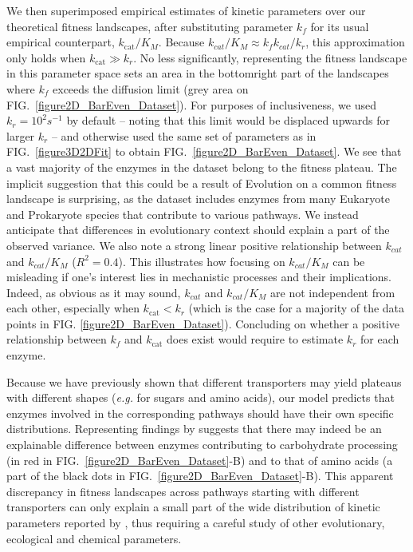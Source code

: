 \documentclass[11pt,onecolumn]{article}
\begin{document}
We then superimposed empirical estimates of kinetic parameters over our theoretical fitness landscapes, after substituting parameter $k_f$ for its usual empirical counterpart, $k_\text{cat} / K_M$. Because $k_{cat}/K_M \approx k_fk_{cat}/k_r$, this approximation only holds when $k_\text{cat} \gg k_r$. No less significantly, representing the fitness landscape in this parameter space
sets an area in the bottomright part of the landscapes where $k_f$ exceeds the diffusion limit (grey area on FIG.~\ref{figure2D_BarEven_Dataset}). For purposes of inclusiveness, we used $k_r=10^{2}s^{-1}$ by default -- noting that this limit would be displaced upwards for larger $k_r$ -- and otherwise used the same set of parameters as in FIG.~\ref{figure3D2DFit} to obtain FIG.~\ref{figure2D_BarEven_Dataset}. We see that a vast majority of the enzymes in the \citet{Bar-Even11} dataset belong to the fitness plateau. The implicit suggestion that this could be a result of Evolution on a common fitness landscape is surprising, as the dataset includes enzymes from many Eukaryote and Prokaryote species that contribute to various pathways. We instead anticipate that differences in evolutionary context should explain a part of the observed variance. We also note a strong linear positive relationship between $k_{cat}$ and $k_{cat}/K_M$ (\textbf{$R^2=0.4$}). This illustrates how focusing on $k_{cat}/K_M$ can be misleading if one's interest lies in mechanistic processes and their implications. Indeed, as obvious as it may sound, $k_{cat}$ and $k_{cat}/K_M$ are not independent from each other, especially when $k_\text{cat}<k_r$ (which is the case for a majority of the data points in FIG. \ref{figure2D_BarEven_Dataset}). Concluding on whether a positive relationship between $k_f$ and $k_\text{cat}$ does exist would require to estimate $k_r$ for each enzyme.

Because we have previously shown that different transporters may yield plateaus with different shapes (\textit{e.g.} for sugars and amino acids), our model predicts that enzymes involved in the corresponding pathways should have their own specific distributions. Representing findings by  \citep{Bar-Even11} suggests that there may indeed be an explainable difference between enzymes contributing to carbohydrate processing (in red in FIG.~\ref{figure2D_BarEven_Dataset}-B) and to that of amino acids (a part of the black dots in FIG.~\ref{figure2D_BarEven_Dataset}-B). %
This apparent discrepancy in fitness landscapes across pathways starting with different transporters can only explain a small part of the wide distribution of kinetic parameters reported by \citet{Bar-Even11}, thus requiring a careful study of other evolutionary, ecological and chemical parameters.
\end{document}
